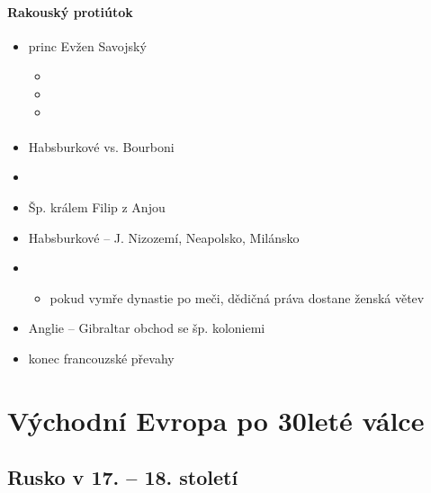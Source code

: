 \paragraph{Rakouský protiútok}
\begin{itemize}
\item princ Evžen Savojský
	\begin{itemize}
	\item {}
	\item {}
	\item {}
	\end{itemize}
\end{itemize}

\paragraph{}
\begin{itemize}
\item Habsburkové vs. Bourboni
\item {}
\item Šp. králem Filip z Anjou
\item Habsburkové -- J. Nizozemí, Neapolsko, Milánsko
\item {}
	\begin{itemize}
	\item pokud vymře dynastie po meči, dědičná práva dostane ženská větev
	\end{itemize}
\item Anglie -- Gibraltar \ra obchod se šp. koloniemi
\item konec francouzské převahy
\end{itemize}


\section{Východní Evropa po 30leté válce}
\subsection{Rusko v 17. -- 18. století}
